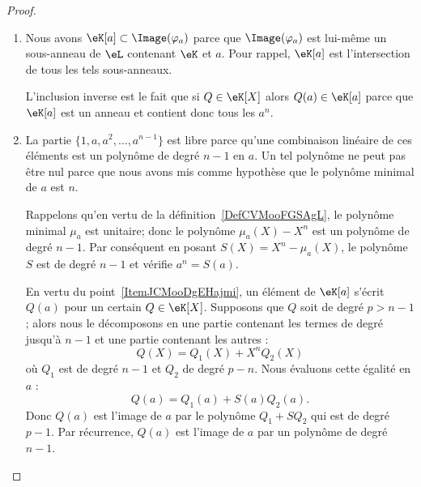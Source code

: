 \begin{proof}
    \begin{enumerate}
        \item
            Nous avons \( \eK[a]\subset \Image(\varphi_a)\) parce que \( \Image(\varphi_a)\) est lui-même un sous-anneau de \( \eL\) contenant \( \eK\) et \( a\). Pour rappel, \( \eK[a]\) est l'intersection de tous les tels sous-anneaux.

            L'inclusion inverse est le fait que si \( Q\in \eK[X]\) alors \( Q(a)\in \eK[a]\) parce que \( \eK[a]\) est un anneau et contient donc tous les \( a^n\).
        \item
            La partie \( \{ 1,a,a^2,\ldots, a^{n-1} \}\) est libre parce qu'une combinaison linéaire de ces éléments est un polynôme de degré \( n-1\) en \( a\). Un tel polynôme ne peut pas être nul parce que nous avons mis comme hypothèse que le polynôme minimal de \( a\) est \( n\).

            Rappelons qu'en vertu de la définition~\ref{DefCVMooFGSAgL}, le polynôme minimal \( \mu_a\) est unitaire; donc le polynôme \( \mu_a(X)-X^n\) est un polynôme de degré \( n-1\). Par conséquent en posant \( S(X)=X^n-\mu_a(X)\), le polynôme \( S\) est de degré \( n-1\) et vérifie \( a^n=S(a)\).

            En vertu du point~\ref{ItemJCMooDgEHajmi}, un élément de \( \eK[a]\) s'écrit \( Q(a)\) pour un certain \( Q\in\eK[X]\). Supposons que \( Q\) soit de degré \( p>n-1\); alors nous le décomposons en une partie contenant les termes de degré jusqu'à \( n-1\) et une partie contenant les autres :
            \begin{equation}
                Q(X)=Q_1(X)+X^nQ_2(X)
            \end{equation}
            où \( Q_1\) est de degré \( n-1\) et \( Q_2\) de degré \( p-n\). Nous évaluons cette égalité en \( a\) :
            \begin{equation}
                Q(a)=Q_1(a)+S(a)Q_2(a).
            \end{equation}
            Donc \( Q(a)\) est l'image de \( a\) par le polynôme \( Q_1+SQ_2\) qui est de degré \( p-1\). Par récurrence, \( Q(a)\) est l'image de \( a\) par un polynôme de degré \( n-1\).


\end{enumerate}
\end{proof}
